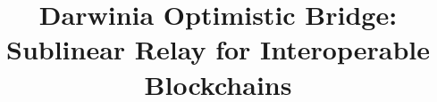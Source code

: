 \documentclass[sigconf]{acmart}
\begin{document}
 

\title{Darwinia Optimistic Bridge: Sublinear Relay for Interoperable Blockchains}


\maketitle







\newpage

\newpage

\end{document}
